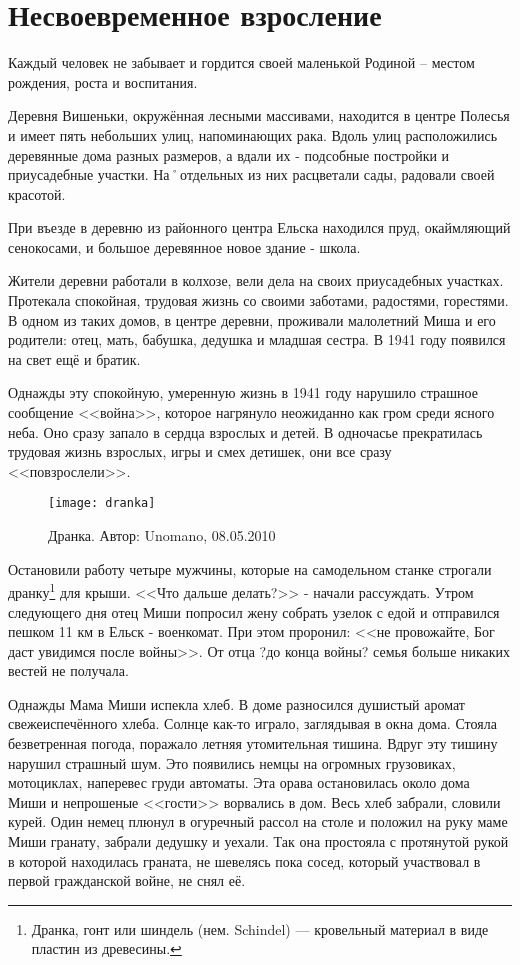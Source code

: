 ﻿\chapter{Несвоевременное взросление}
Каждый человек не забывает и гордится своей маленькой Родиной \--- местом рождения, роста и воспитания.

Деревня Вишеньки, окружённая лесными массивами, находится в центре Полесья и имеет пять небольших улиц, напоминающих рака. Вдоль улиц расположились деревянные дома разных размеров, а вдали их - подсобные постройки и приусадебные участки. На˚отдельных из них расцветали сады, радовали своей красотой.

При въезде в деревню из районного центра Ельска находился пруд, окаймляющий сенокосами, и большое деревянное новое здание - школа. 

Жители деревни работали в колхозе, вели дела на своих приусадебных участках. Протекала спокойная, трудовая жизнь со своими заботами, радостями, горестями. В одном из таких домов, в центре деревни, проживали малолетний Миша и его родители: отец, мать, бабушка, дедушка и младшая сестра. В 1941 году появился на свет ещё и братик. 

Однажды эту спокойную, умеренную жизнь в 1941 году нарушило страшное сообщение <<война>>, которое нагрянуло неожиданно как гром среди ясного неба. Оно сразу запало в сердца взрослых и детей. В одночасье прекратилась трудовая жизнь взрослых, игры и смех детишек, они все сразу <<повзрослели>>. 

\begin{wrapfigure}{O}{.4\textwidth}
\centering
\texttt{[image: dranka]}
\caption{Дранка. Автор: Unomano, 08.05.2010}
\label{fig:dranka}
\end{wrapfigure}

Остановили работу четыре мужчины, которые на самодельном станке строгали дранку\footnote{Дранка, гонт или шиндель (нем. Schindel) — кровельный материал в виде пластин из древесины.} для крыши. <<Что дальше делать?>> - начали рассуждать. Утром следующего дня отец Миши попросил жену собрать узелок с едой и отправился пешком 11 км в Ельск - военкомат. При этом проронил: <<не провожайте, Бог даст увидимся после войны>>. От отца ?до конца войны? семья больше никаких вестей не получала. 

Однажды Мама Миши испекла хлеб. В доме разносился душистый аромат свежеиспечённого хлеба. Солнце как-то играло, заглядывая в окна дома. Стояла безветренная погода, поражало летняя утомительная тишина. Вдруг эту тишину нарушил страшный шум. Это появились немцы на огромных грузовиках, мотоциклах, наперевес груди автоматы. Эта орава остановилась около дома Миши и непрошеные <<гости>> ворвались в дом. Весь хлеб забрали, словили курей. Один немец плюнул в огуречный рассол на столе и положил на руку маме Миши гранату, забрали дедушку и уехали. Так она простояла с протянутой рукой в которой находилась граната, не шевелясь пока сосед, который участвовал в первой гражданской войне, не снял её.

